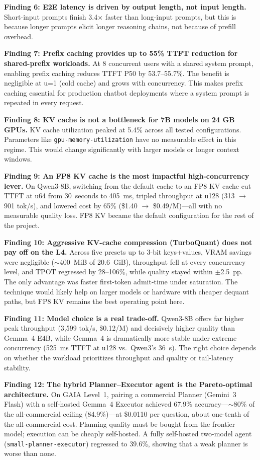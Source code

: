 \documentclass[a4paper,12pt]{report}
\begin{document}
\textbf{Finding 6: E2E latency is driven by output length, not input length.} Short-input prompts finish 3.4$\times$ faster than long-input prompts, but this is because longer prompts elicit longer reasoning chains, not because of prefill overhead.

\textbf{Finding 7: Prefix caching provides up to 55\% TTFT reduction for shared-prefix workloads.} At 8 concurrent users with a shared system prompt, enabling prefix caching reduces TTFT P50 by 53.7--55.7\%. The benefit is negligible at u=1 (cold cache) and grows with concurrency. This makes prefix caching essential for production chatbot deployments where a system prompt is repeated in every request.

\textbf{Finding 8: KV cache is not a bottleneck for 7B models on 24 GB GPUs.} KV cache utilization peaked at 5.4\% across all tested configurations. Parameters like \texttt{gpu-memory-utilization} have no measurable effect in this regime. This would change significantly with larger models or longer context windows.

\textbf{Finding 9: An FP8 KV cache is the most impactful high-concurrency lever.} On Qwen3-8B, switching from the default cache to an FP8 KV cache cut TTFT at u64 from 30~seconds to 405~ms, tripled throughput at u128 (313 $\to$ 901 tok/s), and lowered cost by 65\% (\$1.40 $\to$ \$0.49/M)---all with no measurable quality loss. FP8 KV became the default configuration for the rest of the project.

\textbf{Finding 10: Aggressive KV-cache compression (TurboQuant) does not pay off on the L4.} Across five presets up to 3-bit keys+values, VRAM savings were negligible ($\sim$400~MiB of 20.6~GiB), throughput fell at every concurrency level, and TPOT regressed by 28--106\%, while quality stayed within $\pm$2.5~pp. The only advantage was faster first-token admit-time under saturation. The technique would likely help on larger models or hardware with cheaper dequant paths, but FP8 KV remains the best operating point here.

\textbf{Finding 11: Model choice is a real trade-off.} Qwen3-8B offers far higher peak throughput (3{,}599 tok/s, \$0.12/M) and decisively higher quality than Gemma~4 E4B, while Gemma~4 is dramatically more stable under extreme concurrency (525~ms TTFT at u128 vs.\ Qwen3's 36~s). The right choice depends on whether the workload prioritizes throughput and quality or tail-latency stability.

\textbf{Finding 12: The hybrid Planner--Executor agent is the Pareto-optimal architecture.} On GAIA Level~1, pairing a commercial Planner (Gemini~3 Flash) with a self-hosted Gemma~4 Executor achieved 67.9\% accuracy---$\sim$80\% of the all-commercial ceiling (84.9\%)---at \$0.0110 per question, about one-tenth of the all-commercial cost. Planning quality must be bought from the frontier model; execution can be cheaply self-hosted. A fully self-hosted two-model agent (\texttt{small-planner-executor}) regressed to 39.6\%, showing that a weak planner is worse than none.
\end{document}
